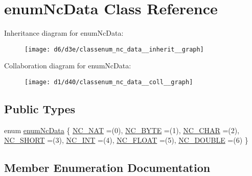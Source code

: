 \hypertarget{classenum_nc_data}{}\section{enum\+Nc\+Data Class Reference}
\label{classenum_nc_data}


Inheritance diagram for enum\+Nc\+Data\+:
\nopagebreak
\begin{figure}[H]
\begin{center}
\leavevmode
\texttt{[image: d6/d3e/classenum\_nc\_data\_\_inherit\_\_graph]}
\end{center}
\end{figure}


Collaboration diagram for enum\+Nc\+Data\+:
\nopagebreak
\begin{figure}[H]
\begin{center}
\leavevmode
\texttt{[image: d1/d40/classenum\_nc\_data\_\_coll\_\_graph]}
\end{center}
\end{figure}
\subsection*{Public Types}
\begin{DoxyCompactItemize}
\item 
enum \hyperlink{classenum_nc_data_afc514181285d8adacb012edfe47f18c5}{enum\+Nc\+Data} \{ \newline
\hyperlink{classenum_nc_data_afc514181285d8adacb012edfe47f18c5a4361635883f8c5384849964c4a2fad81}{N\+C\+\_\+\+N\+AT} =(0), 
\hyperlink{classenum_nc_data_afc514181285d8adacb012edfe47f18c5a22ce880379202263ae09ff0cc5f4bf41}{N\+C\+\_\+\+B\+Y\+TE} =(1), 
\hyperlink{classenum_nc_data_afc514181285d8adacb012edfe47f18c5aad5dc3f583b5358db6a32d3579dcdc66}{N\+C\+\_\+\+C\+H\+AR} =(2), 
\hyperlink{classenum_nc_data_afc514181285d8adacb012edfe47f18c5afc1e57065367ac8319ae0a6436fb55e7}{N\+C\+\_\+\+S\+H\+O\+RT} =(3), 
\newline
\hyperlink{classenum_nc_data_afc514181285d8adacb012edfe47f18c5a588a1b7c599bb22c2349c51d876f44ac}{N\+C\+\_\+\+I\+NT} =(4), 
\hyperlink{classenum_nc_data_afc514181285d8adacb012edfe47f18c5a919bbd12cd9337c6495f6d31fae43f6f}{N\+C\+\_\+\+F\+L\+O\+AT} =(5), 
\hyperlink{classenum_nc_data_afc514181285d8adacb012edfe47f18c5af9534d989d3dc56d0ef6c4e04531c7b0}{N\+C\+\_\+\+D\+O\+U\+B\+LE} =(6)
 \}
\end{DoxyCompactItemize}


\subsection{Member Enumeration Documentation}
\mbox{\label{classenum_nc_data_afc514181285d8adacb012edfe47f18c5}} 
